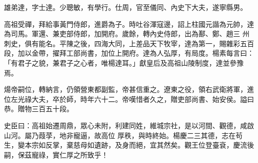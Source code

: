 \begin{pinyinscope}
 雄弟達，字士達。少聰敏，有學行。仕周，官至儀同、內史下大夫，遂寧縣男。



 高祖受禪，拜給事黃門侍郎，進爵為子。時吐谷渾寇邊，詔上柱國元諧為元帥，達為司馬。軍還、兼吏部侍郎，加開府。歲餘，轉內史侍郎，出為鄯、鄭、趙三
 州刺史，俱有能名。平陳之後，四海大同，上差品天下牧宰，達為第一，賜雜彩五百段，加以金帶，擢拜工部尚書，加位上開府。達為人弘厚，有局度。楊素每言曰：「有君子之貌，兼君子之心者，唯楊達耳。」獻皇后及高祖山陵制度，達並參豫焉。



 煬帝嗣位，轉納言，仍領營東都副監，帝甚信重之。遼東之役，領右武衛將軍，進位左光祿大夫，卒於師，時年六十二。帝嘆惜者久之，贈吏部尚書、始安侯。謚曰恭。贈物三百五十段。



 史臣曰：高祖始遷周鼎，眾心未附，利建同姓，維城宗社，是以河間、觀德，咸啟山河。屬乃葭莩，地非寵逼，故高位
 厚秩，與時終始。楊慶二三其德，志在茍生，變本宗如反掌，棄慈母如遺跡，及身而絕，宜其然矣。觀王位登臺袞，慶流後嗣，保茲寵祿，實仁厚之所致乎！



\end{pinyinscope}